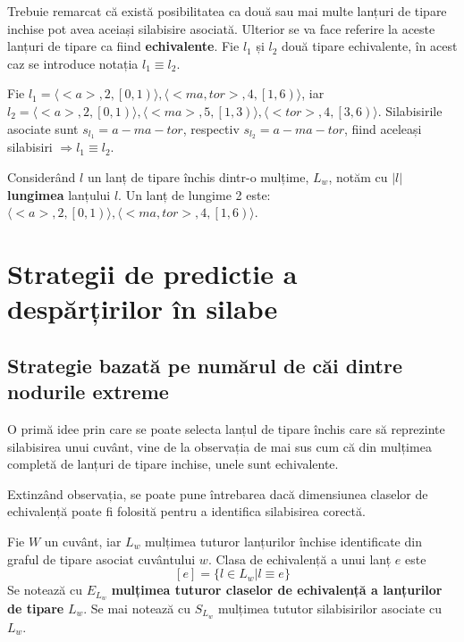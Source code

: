 \begin{defi}
Trebuie remarcat că există posibilitatea ca două sau mai multe lanțuri de tipare inchise pot avea aceiași silabisire asociată. Ulterior se va face referire la aceste lanțuri de tipare ca fiind \textbf{echivalente}. Fie $l_1$ și $l_2$ două tipare echivalente, în acest caz se introduce notația $l_1 \equiv l_2$.
\end{defi}

\begin{ex}
Fie $l_1 = \langle <a>, 2, \left[ 0, 1 \right)\rangle, \langle <ma, tor>, 4, \left[ 1, 6 \right)\rangle$, iar $l_2 = \langle <a>, 2, \left[ 0, 1 \right)\rangle, \langle <ma>, 5, \left[ 1, 3 \right)\rangle, \langle <tor>, 4, \left[ 3, 6 \right)\rangle$. Silabisirile asociate sunt $s_{l_1} = a-ma-tor$, respectiv $s_{l_2} = a-ma-tor$, fiind aceleași silabisiri $\Rightarrow l_1 \equiv l_2$.
\end{ex}

\begin{defi}
Considerând $l$ un lanț de tipare închis dintr-o mulțime, $L_w$, notăm cu $\vert l \vert $ \textbf{lungimea} lanțului $l$. Un lanț de lungime 2 este: $\langle <a>, 2, \left[ 0, 1 \right)\rangle, \langle <ma, tor>, 4, \left[ 1, 6 \right)\rangle$.
\end{defi}


\section{Strategii de predictie a despărțirilor în silabe}

\subsection{Strategie bazată pe numărul de căi dintre nodurile extreme}

O primă idee prin care se poate selecta lanțul de tipare închis care să reprezinte silabisirea unui cuvânt, vine de la observația de mai sus cum că din mulțimea completă de lanțuri de tipare inchise, unele sunt echivalente. 

Extinzând observația, se poate pune întrebarea dacă dimensiunea claselor de echivalență poate fi folosită pentru a identifica silabisirea corectă. 

\begin{defi}
Fie $W$ un cuvânt, iar $L_w$ mulțimea tuturor lanțurilor închise identificate din graful de tipare asociat cuvântului $w$. Clasa de echivalență a unui lanț $e$ este 
\begin{equation}
\left[e\right] = \{l \in L_w \vert l \equiv e\}
\end{equation}
Se notează cu $E_{L_w}$\textbf{ mulțimea tuturor claselor de echivalență a lanțurilor de tipare} $L_w$. Se mai notează cu $S_{L_w}$ mulțimea tututor silabisirilor asociate cu $L_w$. 
\end{defi}

